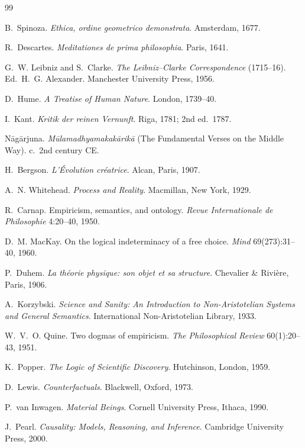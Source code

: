 \documentclass[11pt]{article}
\theoremstyle{remark}
\begin{document}
\begin{thebibliography}{99}
\setlength{\itemsep}{2pt}

 B.~Spinoza. \emph{Ethica, ordine geometrico demonstrata}. Amsterdam, 1677.

 R.~Descartes. \emph{Meditationes de prima philosophia}. Paris, 1641.

 G.~W. Leibniz and S.~Clarke. \emph{The Leibniz--Clarke Correspondence} (1715--16). Ed.\ H.~G. Alexander. Manchester University Press, 1956.

 D.~Hume. \emph{A Treatise of Human Nature}. London, 1739--40.

 I.~Kant. \emph{Kritik der reinen Vernunft}. Riga, 1781; 2nd ed.\ 1787.

 N\=ag\=arjuna. \emph{M\=ulamadhyamakak\=arik\=a} (The Fundamental Verses on the Middle Way). c.~2nd century CE.

 H.~Bergson. \emph{L'\'Evolution cr\'eatrice}. Alcan, Paris, 1907.

 A.~N. Whitehead. \emph{Process and Reality}. Macmillan, New York, 1929.

 R.~Carnap. Empiricism, semantics, and ontology. \emph{Revue Internationale de Philosophie} 4:20--40, 1950.

 D.~M. MacKay. On the logical indeterminacy of a free choice. \emph{Mind} 69(273):31--40, 1960.

 P.~Duhem. \emph{La th\'eorie physique: son objet et sa structure}. Chevalier \& Rivi\`ere, Paris, 1906.

 A.~Korzybski. \emph{Science and Sanity: An Introduction to Non-Aristotelian Systems and General Semantics}. International Non-Aristotelian Library, 1933.

 W.~V.~O. Quine. Two dogmas of empiricism. \emph{The Philosophical Review} 60(1):20--43, 1951.

 K.~Popper. \emph{The Logic of Scientific Discovery}. Hutchinson, London, 1959.

 D.~Lewis. \emph{Counterfactuals}. Blackwell, Oxford, 1973.

 P.~van Inwagen. \emph{Material Beings}. Cornell University Press, Ithaca, 1990.

 J.~Pearl. \emph{Causality: Models, Reasoning, and Inference}. Cambridge University Press, 2000.


\end{thebibliography}
\end{document}
